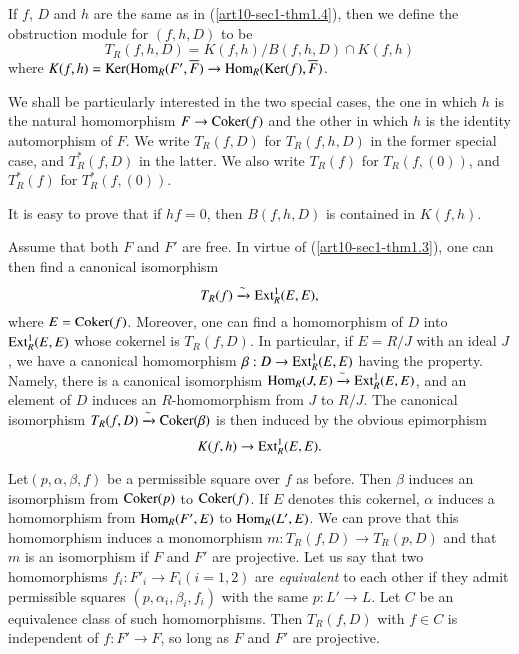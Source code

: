 \begin{definition}\label{art10-sec1-defi1.5}
If $f$, $D$ and $h$ are the same as in (\ref{art10-sec1-thm1.4}), then we define the obstruction module for $(f,h,D)$ to be
$$
T_{R}(f,h,D)=K(f,h)/B(f,h,D)\cap K(f,h)
$$
where $K(f,h)=\operatorname{\mathrm{Ker}}(\operatorname{\mathrm{Hom}}_{R}(F',\overline{F})\to \operatorname{\mathrm{Hom}}_{R}(\operatorname{\mathrm{Ker}}(f),\overline{F})$.
\end{definition}

We shall be particularly interested in the two special cases, the one in which $h$ is the natural homomorphism $F\to \operatorname{\mathrm{Coker}} (f)$ and the other in which $h$ is the identity automorphism of $F$. We write $T_{R}(f,D)$ for $T_{R}(f,h,D)$ in the former special case, and $T^{*}_{R}(f,D)$ in the latter. We also write $T_{R}(f)$ for $T_{R}(f,(0))$, and $T^{*}_{R}(f)$ for $T^{*}_{R}(f,(0))$.

\setcounter{subsection}{5}
\setcounter{subsubsection}{0}
\begin{subremark}\label{art10-sec1-rem1.5.1}
It is easy to prove that if $hf=0$, then $B(f,h,D)$ is contained in $K(f,h)$.
\end{subremark}

\begin{subremark}\label{art10-sec1-rem1.5.2}
Assume that both $F$ and $F'$ are free. In virtue of (\ref{art10-sec1-thm1.3}), one can then find a canonical isomorphism
$$
T_{R}(f)\xrightarrow{\sim}\operatorname{\mathrm{Ext}}^{1}_{R}(E,E),
$$
where $E=\operatorname{\mathrm{Coker}} (f)$. Moreover, one can find a homomorphism of $D$ into $\operatorname{\mathrm{Ext}}^{1}_{R}(E,E)$ whose cokernel is $T_{R}(f,D)$. In particular, if $E=R/J$ with an ideal $J$, we have a canonical homomorphism $\beta:D\to \operatorname{\mathrm{Ext}}^{1}_{R}(E,E)$ having the property. Namely, there is a canonical isomorphism $\operatorname{\mathrm{Hom}}_{R}(J,E)\xrightarrow{\sim}\operatorname{\mathrm{Ext}}^{1}_{R}(E,E)$, and an element of $D$ induces an $R$-homomorphism from $J$ to $R/J$. The canonical isomorphism $T_{R}(f,D)\xrightarrow{\sim}\operatorname{\mathrm{Coker}} (\beta)$ is then induced by the obvious epimorphism 
$$
K(f,h)\to \operatorname{\mathrm{Ext}}^{1}_{R}(E,E).
$$
\end{subremark}

\begin{subremark}\label{art10-sec1-rem1.5.3}
Let\pageoriginale $(p,\alpha,\beta,f)$ be a permissible square over $f$ as before. Then $\beta$ induces an isomorphism from $\operatorname{\mathrm{Coker}} (p)$ to $\operatorname{\mathrm{Coker}}(f)$. If $E$ denotes this cokernel, $\alpha$ induces a homomorphism from $\operatorname{\mathrm{Hom}}_{R}(F',E)$ to $\operatorname{\mathrm{Hom}}_{R}(L',E)$. We can prove that this homomorphism induces a mono\-morphism $m:T_{R}(f,D)\to T_{R}(p,D)$ and that $m$ is an isomorphism if $F$ and $F'$ are projective. Let us say that two homomorphisms $f_{i}:F'_{i}\to F_{i}(i=1,2)$ are {\em equivalent} to each other if they admit permissible squares $(p,\alpha_{i},\beta_{i},f_{i})$ with the same $p:L'\to L$. Let $C$ be an equivalence class of such homomorphisms. Then $T_{R}(f,D)$ with $f\in C$ is independent of $f:F'\to F$, so long as $F$ and $F'$ are projective.
\end{subremark}

